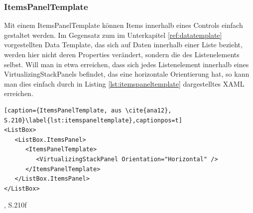 \documentclass[a4paper,bibtotoc,oneside]{scrbook}
\begin{document}
\subsubsection[ItemsPanelTemplate]{ItemsPanelTemplate}\label{itemspaneltemplate}
Mit einem ItemsPanelTemplate können Items innerhalb eines Controls einfach gestaltet werden. Im Gegensatz zum im Unterkapitel \ref{ref:datatemplate} vorgestellten Data Template, das sich auf Daten innerhalb einer Liste bezieht, werden hier nicht deren Properties verändert, sondern die des Listenelements selbst. Will man in etwa erreichen, dass sich jedes Listenelement innerhalb eines VirtualizingStackPanels befindet, das eine horizontale Orientierung hat, so kann man dies einfach durch in Listing \ref{lst:itemspaneltemplate} dargestelltes XAML erreichen.
\begin{lstlisting}[caption={ItemsPanelTemplate, aus \cite{ana12}, S.210}\label{lst:itemspaneltemplate},captionpos=t]
<ListBox>
   <ListBox.ItemsPanel>
      <ItemsPanelTemplate>
         <VirtualizingStackPanel Orientation="Horizontal" />
      </ItemsPanelTemplate>
   </ListBox.ItemsPanel>
</ListBox>
\end{lstlisting}
\cite{ana12}, S.210f
\end{document}
